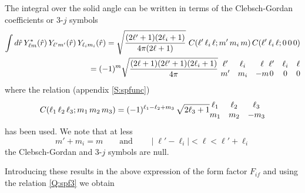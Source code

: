 The integral over the solid angle can be written in terms of the
Clebsch-Gordan coefficients or 3-$j$ symbols \cite[(A.44)]{Galindo1990_QMvI}
%
\begin{eqnarray*}
\int d \hat{r}\, Y^{*}_{\ell m}(\hat{r}) \, Y_{\ell' m'}(\hat{r}) \,
Y_{\ell_{i} m_{i}}(\hat{r}) = \sqrt{\frac{(2 \ell' + 1)(2 \ell_{i} +
1)}{4 \pi (2 \ell + 1)}} \ C(\ell' \, \ell_{i} \, \ell; m' \, m_{i} \,
m)\, C(\ell' \, \ell_{i} \, \ell;0 \, 0 \, 0)
\\
= (-1)^{m} \sqrt{\frac{(2 \ell + 1)(2 \ell' + 1)(2 \ell_{i} + 1)}{4 \pi
}} \ 
\begin{matrix}
\ell' & \ell_{i} & \ell \cr m' & m_{i} & - m 
\end{matrix}
\begin{matrix}
\ell' & \ell_{i} & \ell \cr 0 & 0 & 0
\end{matrix}
\end{eqnarray*}
%
where the relation \cite[(3.7.3)]{Edmonds1960_AMI} (appendix \ref{S:spfunc})
\begin{equation}\label{Q:ap5}
C(\ell_{1} \, \ell_{2} \, \ell_{3}; m_{1} \, m_{2} \, m_{3}) =
(-1)^{\ell_{1}-\ell_{2} + m_{3}} \, \sqrt{2 \ell_{3} + 1} 
\begin{matrix}
\ell_{1} & \ell_{2} & \ell_{3} \cr m_{1} & m_{2} & -m_{3}
\end{matrix}
\end{equation}
has been used. We note that at less
\[
m'+ m_{i}= m  \qquad \mbox{and} \qquad \mid \ell'-\ell_{i}\mid < \ell <
\ell' + \ell_{i}
\]
the Clebsch-Gordan and 3-$j$ symbols are null.

Introducing these results in the above expression of the form factor
$F_{if}$ and using the relation \ref{Q:spf3} we obtain

